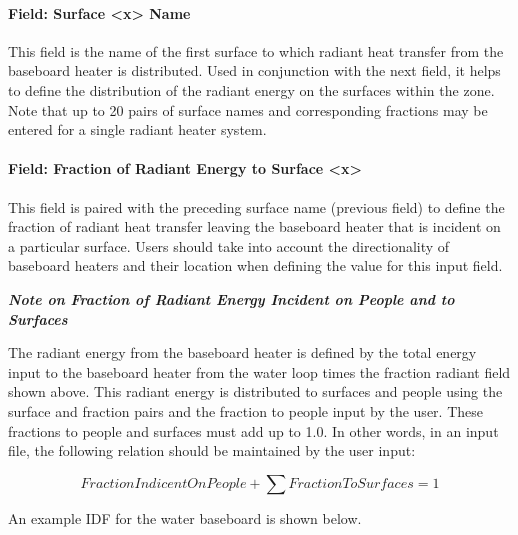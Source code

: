 \paragraph{Field: Surface \textless{}x\textgreater{} Name}\label{field-surface-x-name}

This field is the name of the first surface to which radiant heat transfer from the baseboard heater is distributed. Used in conjunction with the next field, it helps to define the distribution of the radiant energy on the surfaces within the zone. Note that up to 20 pairs of surface names and corresponding fractions may be entered for a single radiant heater system.

\paragraph{Field: Fraction of Radiant Energy to Surface \textless{}x\textgreater{}}\label{field-fraction-of-radiant-energy-to-surface-x}

This field is paired with the preceding surface name (previous field) to define the fraction of radiant heat transfer leaving the baseboard heater that is incident on a particular surface. Users should take into account the directionality of baseboard heaters and their location when defining the value for this input field.

\textbf{\emph{Note on Fraction of Radiant Energy Incident on People and to Surfaces}}

The radiant energy from the baseboard heater is defined by the total energy input to the baseboard heater from the water loop times the fraction radiant field shown above. This radiant energy is distributed to surfaces and people using the surface and fraction pairs and the fraction to people input by the user. These fractions to people and surfaces must add up to 1.0. In other words, in an input file, the following relation should be maintained by the user input:

\begin{equation}
FractionIndicentOnPeople + \sum {FractionToSurfaces = 1}
\end{equation}

An example IDF for the water baseboard is shown below.

